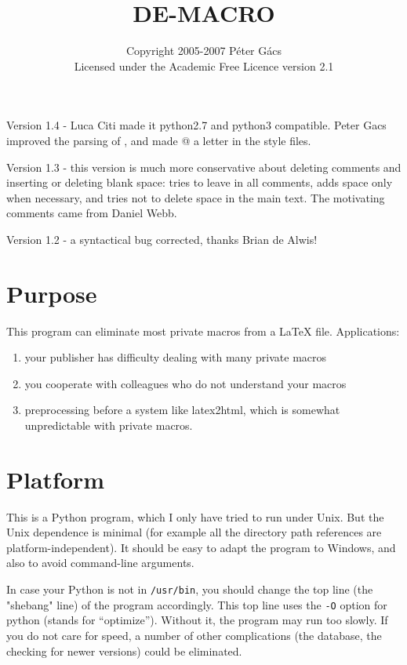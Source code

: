 \documentclass[11pt]{article}
\begin{document}
 \title{DE-MACRO}

 \author{Copyright 2005-2007 P\'eter G\'acs\\
Licensed under the Academic Free Licence version 2.1}

\maketitle

Version 1.4	 - Luca Citi made it python2.7 and python3 compatible.
			   Peter Gacs improved the parsing of \verb``,
			   and made @ a letter in the style files.

Version 1.3 - this version is much more conservative about deleting
              comments and inserting or deleting blank space: tries to
              leave in all comments, adds space only when necessary, and
              tries not to delete space in the main text.
              The motivating comments came from Daniel Webb.

Version 1.2 - a syntactical bug corrected, thanks Brian de Alwis!
 
 \section*{Purpose}

This program can eliminate most private macros from a LaTeX file.
Applications:
 \begin{enumerate}[--]
  \item your publisher has difficulty dealing with many private macros
  \item you cooperate with colleagues who do not understand your macros
  \item preprocessing before a system like latex2html, which is somewhat
    unpredictable with private macros.
 \end{enumerate}
 
 \section*{Platform}

This is a Python program, which I only have tried to run under Unix.  
But the Unix dependence is minimal (for example all the directory path
references are platform-independent).  
It should be easy to adapt the
program to Windows, and also to avoid command-line arguments.

In case your Python is not in \verb`/usr/bin`, you should change the
top line (the "shebang" line) of the program accordingly.
This top line uses the \verb`-O` option for python (stands for ``optimize'').
Without it, the program may run too slowly.  
If you do not care for speed,
a number of other complications (the database, the checking for newer
versions) could be eliminated.
\end{document}
